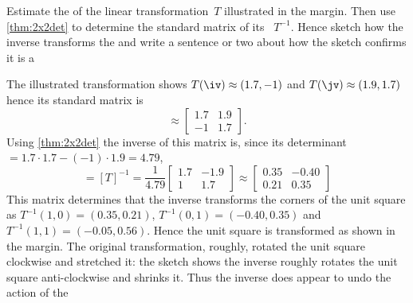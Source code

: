 \begin{example} 
Estimate the  of the linear transformation~\(T\) illustrated in the margin.  
%
Then use \cref{thm:2x2det} to determine the standard matrix of its 
~\(T^{-1}\).
Hence sketch how the inverse transforms the  and write a sentence or two about how the sketch confirms it is a 
\begin{solution} 
The illustrated transformation shows \(T(\iv)\approx(1.7,-1)\) and \(T(\jv)\approx(1.9,1.7)\) hence its standard matrix is
\begin{equation*}
[T]\approx\begin{bmatrix} 1.7&1.9\\-1&1.7 \end{bmatrix}.
\end{equation*}
Using \cref{thm:2x2det} the inverse of this matrix is, since its determinant\({}=1.7\cdot1.7-(-1)\cdot1.9=4.79\),
\begin{equation*}
[T^{-1}]=[T]^{-1}
=\frac1{4.79} \begin{bmatrix} 1.7&-1.9\\1&1.7 \end{bmatrix}
\approx\begin{bmatrix} 0.35&-0.40\\0.21&0.35 \end{bmatrix}
\end{equation*}
This matrix determines that the inverse transforms the corners of the unit square as \(T^{-1}(1,0)=(0.35,0.21)\), \(T^{-1}(0,1)=(-0.40,0.35)\) and \(T^{-1}(1,1)=(-0.05,0.56)\).
%
Hence the unit square is transformed as shown in the margin.
The original transformation, roughly, rotated the unit square clockwise and stretched it: the sketch shows the inverse roughly rotates the unit square anti-clockwise and shrinks it.  
Thus the inverse does appear to undo the action of the 
\end{solution}
\end{example}




